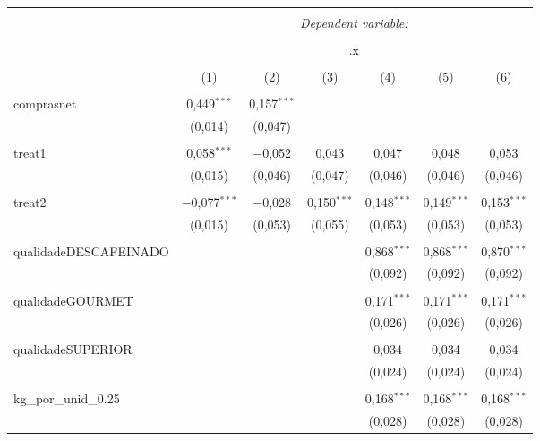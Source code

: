 
\begin{table}[!htbp] \centering 
  \caption{} 
  \label{} 
\begin{tabular}{@{\extracolsep{5pt}}lcccccc} 
\\[-1.8ex]\hline 
\hline \\[-1.8ex] 
 & \multicolumn{6}{c}{\textit{Dependent variable:}} \\ 
\cline{2-7} 
\\[-1.8ex] & \multicolumn{6}{c}{.x} \\ 
\\[-1.8ex] & (1) & (2) & (3) & (4) & (5) & (6)\\ 
\hline \\[-1.8ex] 
 comprasnet & 0,449$^{***}$ & 0,157$^{***}$ &  &  &  &  \\ 
  & (0,014) & (0,047) &  &  &  &  \\ 
  & & & & & & \\ 
 treat1 & 0,058$^{***}$ & $-$0,052 & 0,043 & 0,047 & 0,048 & 0,053 \\ 
  & (0,015) & (0,046) & (0,047) & (0,046) & (0,046) & (0,046) \\ 
  & & & & & & \\ 
 treat2 & $-$0,077$^{***}$ & $-$0,028 & 0,150$^{***}$ & 0,148$^{***}$ & 0,149$^{***}$ & 0,153$^{***}$ \\ 
  & (0,015) & (0,053) & (0,055) & (0,053) & (0,053) & (0,053) \\ 
  & & & & & & \\ 
 qualidadeDESCAFEINADO &  &  &  & 0,868$^{***}$ & 0,868$^{***}$ & 0,870$^{***}$ \\ 
  &  &  &  & (0,092) & (0,092) & (0,092) \\ 
  & & & & & & \\ 
 qualidadeGOURMET &  &  &  & 0,171$^{***}$ & 0,171$^{***}$ & 0,171$^{***}$ \\ 
  &  &  &  & (0,026) & (0,026) & (0,026) \\ 
  & & & & & & \\ 
 qualidadeSUPERIOR &  &  &  & 0,034 & 0,034 & 0,034 \\ 
  &  &  &  & (0,024) & (0,024) & (0,024) \\ 
  & & & & & & \\ 
 kg\_por\_unid\_0.25 &  &  &  & 0,168$^{***}$ & 0,168$^{***}$ & 0,168$^{***}$ \\ 
  &  &  &  & (0,028) & (0,028) & (0,028) \\ 

\end{tabular}
\end{table}
